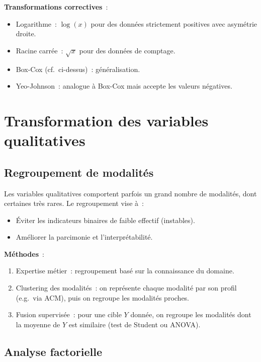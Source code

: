 \documentclass[a4paper,11pt]{article}
\theoremstyle{definition}
\theoremstyle{remark}
\begin{document}
\textbf{Transformations correctives}~:
\begin{itemize}
  \item Logarithme~: $\log(x)$ pour des données strictement positives
    avec asymétrie droite.
  \item Racine carrée~: $\sqrt{x}$ pour des données de comptage.
  \item Box-Cox (cf.~ci-dessus)~: généralisation.
  \item Yeo-Johnson~: analogue à Box-Cox mais accepte les valeurs
    négatives.
\end{itemize}

\section{Transformation des variables qualitatives}

\subsection{Regroupement de modalités}

Les variables qualitatives comportent parfois un grand nombre de modalités,
dont certaines très rares. Le regroupement vise à~:
\begin{itemize}
  \item Éviter les indicateurs binaires de faible effectif (instables).
  \item Améliorer la parcimonie et l'interprétabilité.
\end{itemize}

\textbf{Méthodes}~:
\begin{enumerate}
  \item Expertise métier~: regroupement basé sur la connaissance du domaine.
  \item Clustering des modalités~: on représente chaque modalité par son
    profil (e.g.\ via ACM), puis on regroupe les modalités proches.
  \item Fusion supervisée~: pour une cible $Y$ donnée, on regroupe les
    modalités dont la moyenne de $Y$ est similaire (test de Student ou
    ANOVA).
\end{enumerate}

\subsection{Analyse factorielle}
\end{document}
